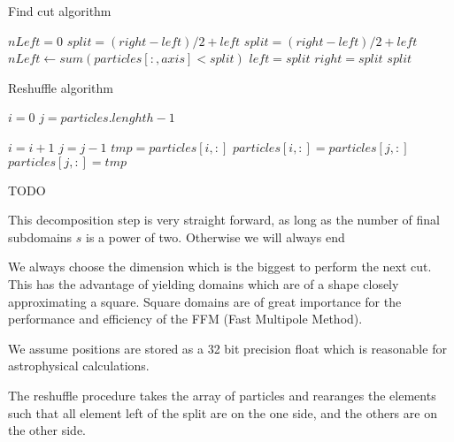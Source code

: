 \documentclass[]{article}
\begin{document}
\begin{algorithm}[H]
	\caption{Find cut algorithm}\label{euclid}
	\begin{algorithmic}[1]
		\State $nLeft = 0$
		\State $split = (right - left) / 2 + left $ 
		\State $split = (right - left) / 2 + left $
		\State $nLeft\gets sum(particles[:,axis] < split)$
		\State $left = split$
		\Else 
		\State $right = split$
		\EndIf
		\EndWhile\label{euclidendwhile}
		\State \Return $split$
		\EndProcedure
	\end{algorithmic}
\end{algorithm}


\begin{algorithm}[H]
	\caption{Reshuffle algorithm}\label{euclid}
	\begin{algorithmic}[1]
		\State $i = 0$
		\State $j = particles.lenghth - 1$
		
		\State $i = i + 1$
		\State $j = j - 1$
		\Else
		\State $tmp = particles[i,:]$
		\State $particles[i,:] = particles[j,:]$
		\State $particles[j,:] = tmp$
		\EndIf
		\EndWhile\label{euclidendwhile}
		
		\EndProcedure
	\end{algorithmic}
\end{algorithm}

\vspace{5mm}

TODO

This decomposition step is very straight forward, as long as the number of final subdomains $s$ is a power of two. Otherwise we will always end 

We always choose the dimension which is the biggest to perform the next cut. This has the advantage of yielding domains which are of a shape closely approximating a square. Square domains are of great importance for the performance and efficiency of the FFM (Fast Multipole Method).

We assume positions are stored as a 32 bit precision float which is reasonable for astrophysical calculations. 

The reshuffle procedure takes the array of particles and rearanges the elements such that all element left of the split are on the one side, and the others are on the other side. 
\end{document}
